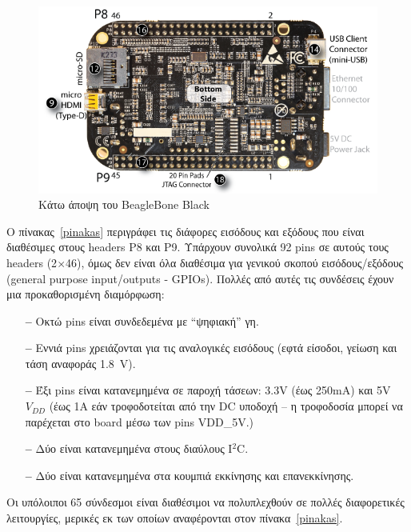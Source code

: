 \documentclass[12pt, a4paper, oneside]{report}
\begin{document}
\begin{figure}[p]
\centering
\includegraphics[width=\textwidth]{eikona_21}
\caption[Κάτω άποψη του BeagleBone Black]{Κάτω άποψη του BeagleBone Black\cite{46}}\label{eik21}
\end{figure}
\clearpage

Ο πίνακας~\ref{pinakas} περιγράφει τις διάφορες εισόδους και εξόδους που είναι διαθέσιμες στους headers P8 και P9. Υπάρχουν συνολικά 92 pins σε αυτούς τους headers (2$\times$46), όμως δεν είναι όλα διαθέσιμα για γενικού σκοπού εισόδους\slash εξόδους (\textenglish{general purpose input\slash outputs - GPIOs}). Πολλές από αυτές τις συνδέσεις έχουν μια προκαθορισμένη διαμόρφωση:
\begin{itemize}
\item[\textbf{--}] Οκτώ pins είναι συνδεδεμένα με ``ψηφιακή'' γη.
\item[\textbf{--}] Εννιά pins χρειάζονται για τις αναλογικές εισόδους (εφτά είσοδοι, γείωση και τάση αναφοράς 1.8~V).
\item[\textbf{--}] Έξι pins είναι κατανεμημένα σε παροχή τάσεων: 3.3V (έως 250mA) και 5V $V_{DD}$ (έως 1A εάν τροφοδοτείται από την DC υποδοχή -- η τροφοδοσία μπορεί να παρέχεται στο board μέσω των pins VDD\_5V.)
\item[\textbf{--}] Δύο είναι κατανεμημένα στους διαύλους I$^2$C.
\item[\textbf{--}] Δύο είναι κατανεμημένα στα κουμπιά εκκίνησης και επανεκκίνησης.
\end{itemize}

Οι υπόλοιποι 65 σύνδεσμοι είναι διαθέσιμοι να πολυπλεχθούν σε πολλές διαφορετικές λειτουργίες, μερικές εκ των οποίων αναφέρονται στον πίνακα~\ref{pinakas}.
\end{document}
